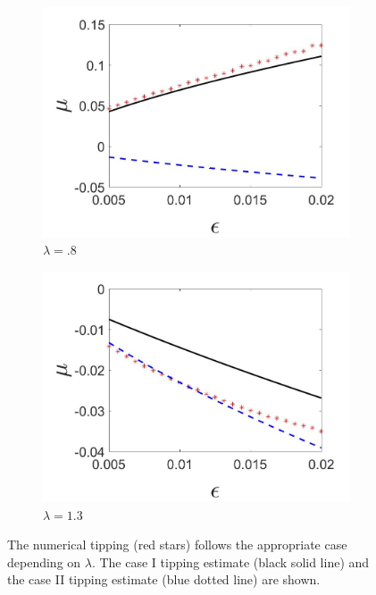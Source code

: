 \begin{figure}[H]
\centering
\begin{subfigure}{.5\textwidth}
 \centering
 \includegraphics[width=\linewidth]{oneD/slowosc_epscomp_case2.jpg}
 \caption{$\lambda=.8$}
\end{subfigure}%
\begin{subfigure}{.5\textwidth}
 \centering
 \includegraphics[width=\linewidth]{oneD/slowosc_epscomp_case3.jpg}
 \caption{$\lambda=1.3$}
\end{subfigure}
\caption{The numerical tipping (red stars) follows the appropriate case depending on $\lambda$. The case I tipping estimate (black solid line) and the case II tipping estimate (blue dotted line) are shown.}
\label{fig:oneD_slowosc_epscomp}
\end{figure}

